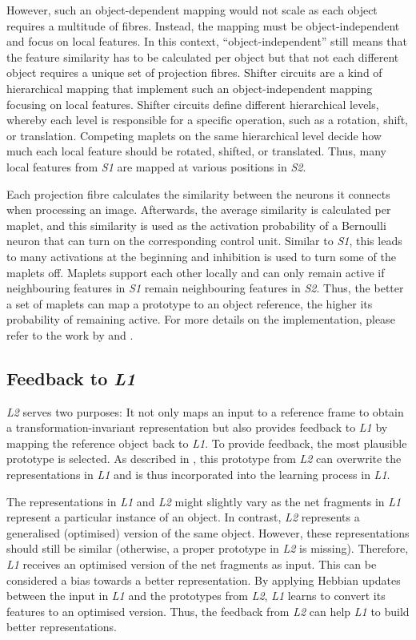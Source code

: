 However, such an object-dependent mapping would not scale as each object requires a multitude of fibres.
Instead, the mapping must be object-independent and focus on local features.
In this context, ``object-independent'' still means that the feature similarity has to be calculated per object but that not each different object requires a unique set of projection fibres.
Shifter circuits  are a kind of hierarchical mapping that implement such an object-independent mapping focusing on local features.
Shifter circuits define different hierarchical levels, whereby each level is responsible for a specific operation, such as a rotation, shift, or translation. 
Competing maplets on the same hierarchical level decide how much each local feature should be rotated, shifted, or translated.
Thus, many local features from \emph{S1} are mapped at various positions in \emph{S2}.

Each projection fibre calculates the similarity between the neurons it connects when processing an image.
Afterwards, the average similarity is calculated per maplet, and this similarity is used as the activation probability of a Bernoulli neuron that can turn on the corresponding control unit.
Similar to \emph{S1}, this leads to many activations at the beginning and inhibition is used to turn some of the maplets off.
Maplets support each other locally and can only remain active if neighbouring features in \emph{S1} remain neighbouring features in \emph{S2}.
Thus, the better a set of maplets can map a prototype to an object reference, the higher its probability of remaining active.
For more details on the implementation, please refer to the work by  and .


\subsection{Feedback to \emph{L1}}
\emph{L2} serves two purposes: It not only maps an input to a reference frame to obtain a transformation-invariant representation but also provides feedback to \emph{L1} by mapping the reference object back to \emph{L1}.
To provide feedback, the most plausible prototype is selected.
As described in , this prototype from \emph{L2} can overwrite the representations in \emph{L1} and is thus incorporated into the learning process in \emph{L1}.

The representations in \emph{L1} and \emph{L2} might slightly vary as the net fragments in \emph{L1} represent a particular instance of an object. In contrast, \emph{L2} represents a generalised (optimised) version of the same object.
However, these representations should still be similar (otherwise, a proper prototype in \emph{L2} is missing).
Therefore, \emph{L1} receives an optimised version of the net fragments as input. This can be considered a bias towards a better representation.
By applying Hebbian updates between the input in \emph{L1} and the prototypes from \emph{L2}, \emph{L1} learns to convert its features to an optimised version.
Thus, the feedback from \emph{L2} can help \emph{L1} to build better representations.


